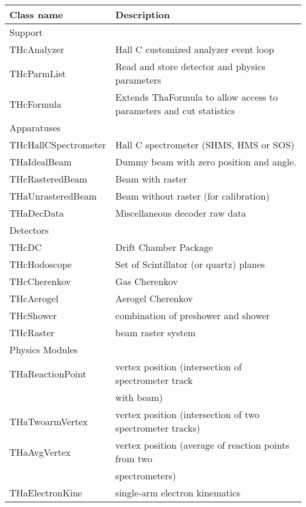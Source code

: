 {{\begin{table}[p]
\begin{tabular}{|l|l|}
\hline
Class name & Description \\
\hline
\multicolumn{2}{|l}{Support} \\
\hline
THcAnalyzer & Hall C customized analyzer event loop \\
THcParmList & Read and store detector and physics parameters \\
THcFormula & Extends ThaFormula to allow access to parameters and cut
statistics \\
\multicolumn{2}{|l}{Apparatuses} \\
\hline
THcHallCSpectrometer  & Hall C spectrometer (SHMS, HMS or SOS) \\
THaIdealBeam & Dummy beam with zero position and angle. \\
THcRasteredBeam & Beam with raster \\
THaUnrasteredBeam & Beam without raster (for calibration) \\
THaDecData   & Miscellaneous decoder raw data \\
\hline
\multicolumn{2}{|l}{Detectors} \\
\hline
THcDC          & Drift Chamber Package \\
THcHodoscope   & Set of Scintillator (or quartz) planes \\
THcCherenkov    & Gas Cherenkov \\
THcAerogel      & Aerogel Cherenkov \\
THcShower       & combination of preshower and shower \\
THcRaster       & beam raster system \\
\hline
\multicolumn{2}{|l}{Physics Modules} \\
\hline
THaReactionPoint & vertex position (intersection of spectrometer track \\
                 & with beam) \\
THaTwoarmVertex  & vertex position (intersection of two spectrometer tracks) \\
THaAvgVertex     & vertex position (average of reaction points from two \\
                 & spectrometers) \\
THaElectronKine  & single-arm electron kinematics \\

\end{tabular}
\end{table}}}
